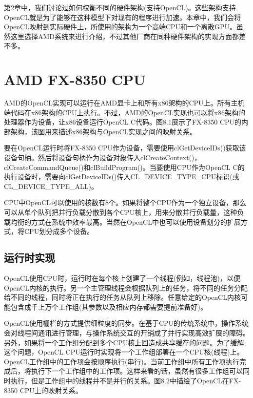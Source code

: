 
第2章中，我们讨论过如何权衡不同的硬件架构(支持OpenCL)。这些架构支持OpenCL就是为了能够在这种模型下对现有的程序进行加速。本章中，我们会将OpenCL映射到实际硬件上，所使用的架构为一个高端CPU和一个离散GPU。虽然这里选择AMD系统来进行介绍，不过其他厂商在同种硬件架构的实现方面都差不多。


\section{AMD FX-8350 CPU}

AMD的OpenCL实现可以运行在AMD显卡上和所有x86架构的CPU上。所有主机端代码在x86架构的CPU上执行。不过，AMD的OpenCL实现也可以将x86架构的处理器作为设备，让x86设备运行OpenCL C代码。图8.1展示了FX-8350 CPU的内部架构，该图用来描述x86架构与OpenCL实现之间的映射关系。

要在OpenCL运行时将FX-8350 CPU作为设备，需要使用clGetDeviceIDs()获取该设备句柄。然后将设备句柄作为设备对象传入clCreateContext()，clCreateCommandQueue()和clBuildProgram()。当要使用CPU作为OpenCL C的执行设备时，需要向clGetDeviceIDs()传入CL\_\allowbreak{}DEVICE\_\allowbreak{}TYPE\_\allowbreak{}CPU标识(或CL\_\allowbreak{}DEVICE\_\allowbreak{}TYPE\_\allowbreak{}ALL)。


CPU中OpenCL可以使用的核数有8个。如果将整个CPU作为一个独立设备，那么可以从单个队列把并行负载分散到各个CPU核上，用来分散并行负载量，这种负载均衡的方式在系统中效率最高。当然在OpenCL中也可以使用设备划分的扩展方式，将CPU划分成多个设备。

\subsection{运行时实现}

OpenCL使用CPU时，运行时在每个核上创建了一个线程(例如，线程池)，以便OpenCL内核的执行。另一个主管理线程会根据队列上的任务，将不同的任务分配给不同的线程，同时将正在执行的任务从队列上移除。任意给定的OpenCL内核可能包含成千上万个工作组(其参数以及相应内存都需要提前准备好)。

OpenCL使用栅栏的方式提供细粒度的同步。在基于CPU的传统系统中，操作系统会对线程间通讯进行管理，与操作系统交互的开销成了并行实现高效扩展的障碍。另外，如果将一个工作组分配到多个CPU核上回造成共享缓存的问题。为了缓解这个问题，OpenCL CPU运行时实现将一个工作组部署在一个CPU核(线程)上。OpenCL工作组中的工作项会按顺序执行(串行)。当前工作组中所有工作项执行完成后，将执行下一个工作组中的工作项。这样来看的话，虽然有很多工作组可以同时执行，但是工作组中的线程并不是并行的关系。图8.2中描绘了OpenCL在FX-8350 CPU上的映射关系。

